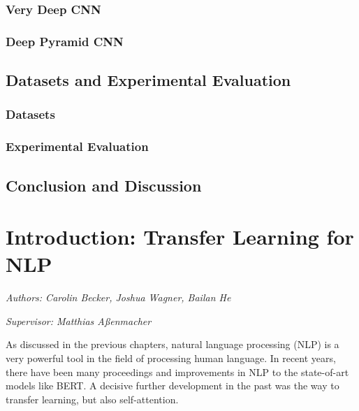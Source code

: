 \documentclass[]{krantz}
\begin{document}
\hypertarget{very-deep-cnn}{%
\subsection{Very Deep CNN}\label{very-deep-cnn}}

\hypertarget{deep-pyramid-cnn}{%
\subsection{Deep Pyramid CNN}\label{deep-pyramid-cnn}}

\hypertarget{datasets-and-experimental-evaluation}{%
\section{Datasets and Experimental Evaluation}\label{datasets-and-experimental-evaluation}}

\hypertarget{datasets}{%
\subsection{Datasets}\label{datasets}}

\hypertarget{experimental-evaluation}{%
\subsection{Experimental Evaluation}\label{experimental-evaluation}}

\hypertarget{conclusion-and-discussion}{%
\section{Conclusion and Discussion}\label{conclusion-and-discussion}}

\hypertarget{introduction-transfer-learning-for-nlp}{%
\chapter{Introduction: Transfer Learning for NLP}\label{introduction-transfer-learning-for-nlp}}

\emph{Authors: Carolin Becker, Joshua Wagner, Bailan He}

\emph{Supervisor: Matthias Aßenmacher}

As discussed in the previous chapters, natural language processing (NLP) is a very powerful tool in the field of processing human language. In recent years, there have been many proceedings and improvements in NLP to the state-of-art models like BERT. A decisive further development in the past was the way to transfer learning, but also self-attention.
\end{document}
